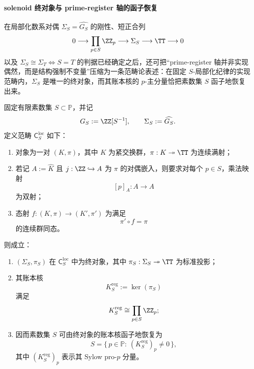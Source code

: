 \paragraph{solenoid 终对象与 prime-register 轴的函子恢复}
在局部化数系对偶 \(\Sigma_S=\widehat{G_S}\) 的刚性、短正合列
\[
0\longrightarrow \prod_{p\in S}\ZZ_p\longrightarrow \Sigma_S\longrightarrow \TT\longrightarrow 0
\]
以及 \(\Sigma_S\cong \Sigma_T\iff S=T\) 的判据已经确定之后，还可把“prime-register 轴并非实现偶然，而是结构强制不变量”压缩为一条范畴论表述：在固定 \(S\)-局部化纪律的实现范畴内，\(\Sigma_S\) 是唯一的终对象，而其账本核的 \(p\)-主分量恰把素数集 \(S\) 函子地恢复出来。

\begin{theorem}\label{thm:xi-time-part56-solenoid-terminal-prime-register-recovery}
固定有限素数集 \(S\subset\mathbb P\)，并记
\[
G_S:=\ZZ[S^{-1}],
\qquad
\Sigma_S:=\widehat{G_S}.
\]
定义范畴 \(\mathsf C_S^{\mathrm{loc}}\) 如下：
\begin{enumerate}
  \item 对象为一对 \((K,\pi)\)，其中 \(K\) 为紧交换群，\(\pi:K\twoheadrightarrow\TT\) 为连续满射；
  \item 若记 \(A:=\widehat K\) 且 \(j:\ZZ\hookrightarrow A\) 为 \(\pi\) 的对偶嵌入，则要求对每个 \(p\in S\)，乘法映射
  \[
  [p]_A:A\longrightarrow A
  \]
  为双射；
  \item 态射 \(f:(K,\pi)\to(K',\pi')\) 为满足
  \[
  \pi' \circ f=\pi
  \]
  的连续群同态。
\end{enumerate}
则成立：
\begin{enumerate}
  \item \((\Sigma_S,\pi_S)\) 在 \(\mathsf C_S^{\mathrm{loc}}\) 中为终对象，其中 \(\pi_S:\Sigma_S\twoheadrightarrow\TT\) 为标准投影；
  \item 其账本核
  \[
  K_S^{\mathrm{reg}}:=\ker(\pi_S)
  \]
  满足
  \[
  K_S^{\mathrm{reg}}\cong \prod_{p\in S}\ZZ_p;
  \]
  \item 因而素数集 \(S\) 可由终对象的账本核函子地恢复为
  \[
  \boxed{\;
  S=\{\,p\in\mathbb P:\ (K_S^{\mathrm{reg}})_p\neq 0\,\},\;}
  \]
  其中 \((K_S^{\mathrm{reg}})_p\) 表示其 Sylow pro-\(p\) 分量。
\end{enumerate}
\end{theorem}

